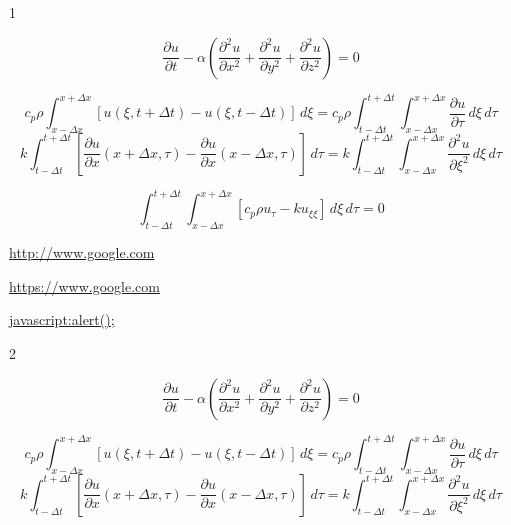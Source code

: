 \documentclass{article}
\begin{document}
\begin{center}
\Huge{1}
\end{center}

\vskip 2cm
\begin{equation}
\frac{\partial u}{\partial t} -\alpha\left(\frac{\partial^2u}{\partial x^2}+\frac{\partial^2u}{\partial y^2}+\frac{\partial^2u}{\partial z^2}\right)=0
\end{equation}

\begin{equation}
c_p\rho \int_{x-\Delta x}^{x+\Delta x} [u(\xi,t+\Delta t)-u(\xi,t-\Delta t)]\, d\xi = c_p\rho\int_{t-\Delta t}^{t+\Delta t}\int_{x-\Delta x}^{x+\Delta x} \frac{\partial u}{\partial\tau}\,d\xi \, d\tau
\end{equation}
\begin{equation}
k\int_{t-\Delta t}^{t+\Delta t}\left[\frac{\partial u}{\partial x}(x+\Delta x,\tau)-\frac{\partial u}{\partial x}(x-\Delta x,\tau)\right]\,d\tau = k\int_{t-\Delta t}^{t+\Delta t}\int_{x-\Delta x}^{x+\Delta x}\frac{\partial^2u}{\partial\xi^2}\,d\xi\, d\tau
\end{equation}

\begin{equation}
\int_{t-\Delta t}^{t+\Delta t}\int_{x-\Delta x}^{x+\Delta x} [c_p\rho u_\tau - k u_{\xi\xi}]\, d\xi \, d\tau = 0
\end{equation}

\url{http://www.google.com}

\url{https://www.google.com}

\url{javascript:alert();}

\newpage

\begin{center}
\Huge{2}
\end{center}

\vskip 2cm
\begin{equation}
\frac{\partial u}{\partial t} -\alpha\left(\frac{\partial^2u}{\partial x^2}+\frac{\partial^2u}{\partial y^2}+\frac{\partial^2u}{\partial z^2}\right)=0
\end{equation}

\begin{equation}
c_p\rho \int_{x-\Delta x}^{x+\Delta x} [u(\xi,t+\Delta t)-u(\xi,t-\Delta t)]\, d\xi = c_p\rho\int_{t-\Delta t}^{t+\Delta t}\int_{x-\Delta x}^{x+\Delta x} \frac{\partial u}{\partial\tau}\,d\xi \, d\tau
\end{equation}
\begin{equation}
k\int_{t-\Delta t}^{t+\Delta t}\left[\frac{\partial u}{\partial x}(x+\Delta x,\tau)-\frac{\partial u}{\partial x}(x-\Delta x,\tau)\right]\,d\tau = k\int_{t-\Delta t}^{t+\Delta t}\int_{x-\Delta x}^{x+\Delta x}\frac{\partial^2u}{\partial\xi^2}\,d\xi\, d\tau
\end{equation}
\end{document}
